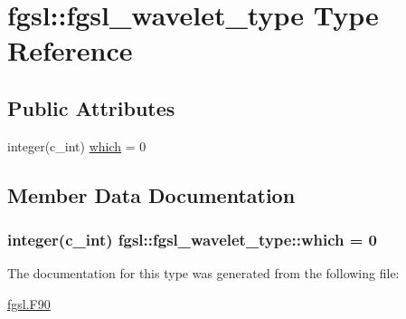 \hypertarget{structfgsl_1_1fgsl__wavelet__type}{\section{fgsl\-:\-:fgsl\-\_\-wavelet\-\_\-type Type Reference}
\label{structfgsl_1_1fgsl__wavelet__type}
}
\subsection*{Public Attributes}
\begin{DoxyCompactItemize}
\item 
integer(c\-\_\-int) \hyperlink{structfgsl_1_1fgsl__wavelet__type_a8dd95cc4a21d5f8f450959d451d515a5}{which} = 0
\end{DoxyCompactItemize}


\subsection{Member Data Documentation}
\hypertarget{structfgsl_1_1fgsl__wavelet__type_a8dd95cc4a21d5f8f450959d451d515a5}{
\subsubsection[{which}]{\setlength{\rightskip}{0pt plus 5cm}integer(c\-\_\-int) fgsl\-::fgsl\-\_\-wavelet\-\_\-type\-::which = 0}}\label{structfgsl_1_1fgsl__wavelet__type_a8dd95cc4a21d5f8f450959d451d515a5}


The documentation for this type was generated from the following file\-:\begin{DoxyCompactItemize}
\item 
\hyperlink{fgsl_8F90}{fgsl.\-F90}\end{DoxyCompactItemize}
